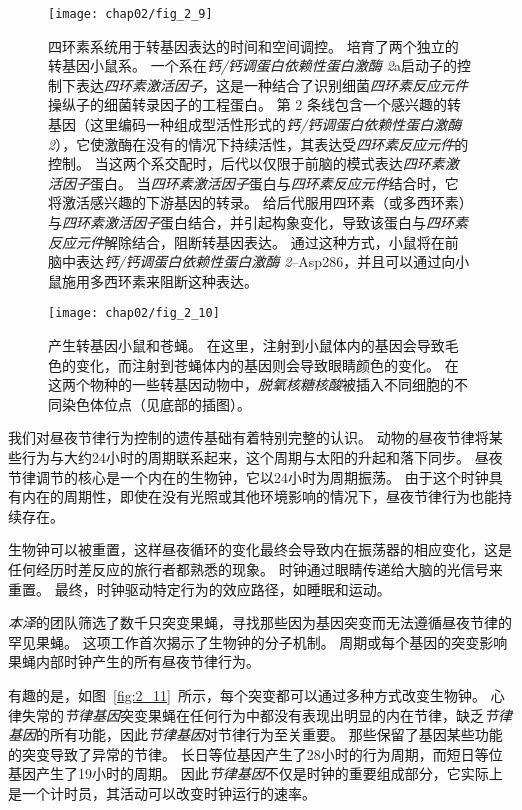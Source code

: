 \begin{figure}[htbp]
	\centering
	\texttt{[image: chap02/fig\_2\_9]}
	\caption{四环素系统用于转基因表达的时间和空间调控。
		培育了两个独立的转基因小鼠系。
		一个系在\textit{钙/钙调蛋白依赖性蛋白激酶 2}a启动子的控制下表达\textit{四环素激活因子}，这是一种结合了识别细菌\textit{四环素反应元件}操纵子的细菌转录因子的工程蛋白。
		第 2 条线包含一个感兴趣的转基因（这里编码一种组成型活性形式的\textit{钙/钙调蛋白依赖性蛋白激酶 2}），它使激酶在没有的情况下持续活性，其表达受\textit{四环素反应元件}的控制。
		当这两个系交配时，后代以仅限于前脑的模式表达\textit{四环素激活因子}蛋白。
		当\textit{四环素激活因子}蛋白与\textit{四环素反应元件}结合时，它将激活感兴趣的下游基因的转录。
		给后代服用四环素（或多西环素）与\textit{四环素激活因子}蛋白结合，并引起构象变化，导致该蛋白与\textit{四环素反应元件}解除结合，阻断转基因表达。
		通过这种方式，小鼠将在前脑中表达\textit{钙/钙调蛋白依赖性蛋白激酶 2}–Asp286，并且可以通过向小鼠施用多西环素来阻断这种表达\cite{mayford1996control}。}
	\label{fig:2_9}
\end{figure}


\begin{figure}[htbp]
	\centering
	\texttt{[image: chap02/fig\_2\_10]}
	\caption{产生转基因小鼠和苍蝇。
		在这里，注射到小鼠体内的基因会导致毛色的变化，而注射到苍蝇体内的基因则会导致眼睛颜色的变化。
		在这两个物种的一些转基因动物中，\textit{脱氧核糖核酸}被插入不同细胞的不同染色体位点（见底部的插图）\cite{alberts2017molecular}。}
	\label{fig:2_10}
\end{figure}




我们对昼夜节律行为控制的遗传基础有着特别完整的认识。
动物的昼夜节律将某些行为与大约24小时的周期联系起来，这个周期与太阳的升起和落下同步。
昼夜节律调节的核心是一个内在的生物钟，它以24小时为周期振荡。
由于这个时钟具有内在的周期性，即使在没有光照或其他环境影响的情况下，昼夜节律行为也能持续存在。



生物钟可以被重置，这样昼夜循环的变化最终会导致内在振荡器的相应变化，这是任何经历时差反应的旅行者都熟悉的现象。
时钟通过眼睛传递给大脑的光信号来重置。
最终，时钟驱动特定行为的效应路径，如睡眠和运动。


\textit{本泽}的团队筛选了数千只突变果蝇，寻找那些因为基因突变而无法遵循昼夜节律的罕见果蝇。
这项工作首次揭示了生物钟的分子机制。
周期或每个基因的突变影响果蝇内部时钟产生的所有昼夜节律行为。


有趣的是，如图~\ref{fig:2_11}~所示，每个突变都可以通过多种方式改变生物钟。
心律失常的\textit{节律基因}突变果蝇在任何行为中都没有表现出明显的内在节律，缺乏\textit{节律基因}的所有功能，因此\textit{节律基因}对节律行为至关重要。
那些保留了基因某些功能的突变导致了异常的节律。
长日等位基因产生了28小时的行为周期，而短日等位基因产生了19小时的周期。
因此\textit{节律基因}不仅是时钟的重要组成部分，它实际上是一个计时员，其活动可以改变时钟运行的速率。


